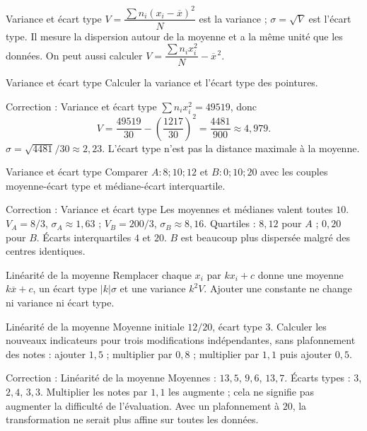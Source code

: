 \documentclass[aspectratio=169,10pt]{beamer}
\begin{document}
\begin{frame}{Variance et écart type}
\(V=\dfrac{\sum n_i(x_i-\overline x)^2}{N}\) est la variance ; \(\sigma=\sqrt V\) est l'écart type. Il mesure la dispersion autour de la moyenne et a la même unité que les données. On peut aussi calculer \(V=\dfrac{\sum n_ix_i^2}{N}-\overline x^{\,2}\).
\end{frame}
\begin{frame}{Variance et écart type}
Calculer la variance et l'écart type des pointures.
\end{frame}
\begin{frame}{Correction : Variance et écart type}
\(\sum n_ix_i^2=49519\), donc
\[V=\dfrac{49519}{30}-\left(\dfrac{1217}{30}\right)^2=\dfrac{4481}{900}\approx4{,}979.\]
\(\sigma=\sqrt{4481}/30\approx2{,}23\). L'écart type n'est pas la distance maximale à la moyenne.
\end{frame}
\begin{frame}{Variance et écart type}
Comparer \(A:8;10;12\) et \(B:0;10;20\) avec les couples moyenne-écart type et médiane-écart interquartile.
\end{frame}
\begin{frame}{Correction : Variance et écart type}
Les moyennes et médianes valent toutes \(10\). \(V_A=8/3\), \(\sigma_A\approx1{,}63\) ; \(V_B=200/3\), \(\sigma_B\approx8{,}16\). Quartiles : \(8,12\) pour \(A\) ; \(0,20\) pour \(B\). Écarts interquartiles \(4\) et \(20\). \(B\) est beaucoup plus dispersée malgré des centres identiques.
\end{frame}
\begin{frame}{Linéarité de la moyenne}
Remplacer chaque \(x_i\) par \(kx_i+c\) donne une moyenne \(k\overline x+c\), un écart type \(|k|\sigma\) et une variance \(k^2V\). Ajouter une constante ne change ni variance ni écart type.
\end{frame}
\begin{frame}{Linéarité de la moyenne}
Moyenne initiale \(12/20\), écart type \(3\). Calculer les nouveaux indicateurs pour trois modifications indépendantes, sans plafonnement des notes : ajouter \(1{,}5\) ; multiplier par \(0{,}8\) ; multiplier par \(1{,}1\) puis ajouter \(0{,}5\).
\end{frame}
\begin{frame}{Correction : Linéarité de la moyenne}
Moyennes : \(13{,}5\), \(9{,}6\), \(13{,}7\). Écarts types : \(3\), \(2{,}4\), \(3{,}3\). Multiplier les notes par \(1{,}1\) les augmente ; cela ne signifie pas augmenter la difficulté de l'évaluation. Avec un plafonnement à \(20\), la transformation ne serait plus affine sur toutes les données.
\end{frame}
\end{document}
